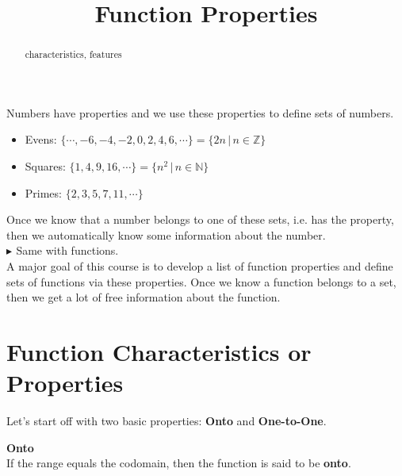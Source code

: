 \documentclass{ximera}
\title{Function Properties}
\begin{document}
\begin{abstract}
characteristics, features
\end{abstract}
\maketitle





Numbers have properties and we use these properties to define sets of numbers. \\



\begin{itemize}
\item Evens:  $\{ \cdots, -6, -4, -2, 0, 2, 4, 6, \cdots \} = \{ 2n   \, | \, n \in \mathbb{Z} \}$
\item Squares:  $\{ 1, 4, 9, 16, \cdots \} = \{ n^2   \, | \, n \in \mathbb{N} \}$
\item Primes:  $\{ 2, 3, 5, 7, 11,  \cdots \}$
\end{itemize}

Once we know that a number belongs to one of these sets, i.e. has the property, then we automatically know some information about the number. \\


\textbf{\textcolor{red!90!darkgray}{$\blacktriangleright$ }} Same with functions. \\



A major goal of this course is to develop a list of function properties and define sets of functions via these properties.  Once we know a function belongs to a set, then we get a lot of free information about the function. \\









\section{Function Characteristics or Properties}


Let's start off with two basic properties: \textbf{Onto} and \textbf{One-to-One}.







\begin{definition} \textbf{\textcolor{green!50!black}{Onto}} \\

If the range equals the codomain, then the function is said to be \textbf{onto}.

\end{definition}
\end{document}
